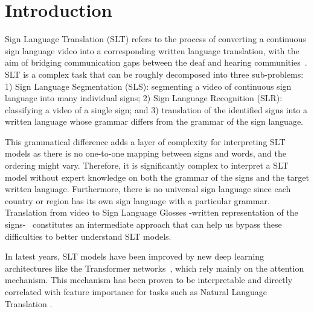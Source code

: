 \section{Introduction}

Sign Language Translation (SLT) refers to the process of converting a continuous sign language video into a corresponding written language translation, with the aim of bridging communication gaps between the deaf and hearing communities~\cite{de2023machine}. SLT is a complex task that can be roughly decomposed into three sub-problems: 1) Sign Language Segmentation (SLS): segmenting a video of continuous sign language into many individual signs; 2) Sign Language Recognition (SLR): classifying a video of a single sign; and 3) translation of the identified signs into a written language whose grammar differs from the grammar of the sign language.

This grammatical difference adds a layer of complexity for interpreting SLT models as there is no one-to-one mapping between signs and words, and the ordering might vary. Therefore, it is significantly complex to interpret a SLT model without expert knowledge on both the grammar of the signs and the target written language. Furthermore, there is no universal sign language since each country or region has its own sign language with a particular grammar. Translation from video to Sign Language Glosses -written representation of the signs-~\cite{camgoz2020sign} constitutes an intermediate approach that can help us bypass these difficulties to better understand SLT models.

In latest years, SLT models have been improved by new deep learning architectures like the Transformer networks~\cite{camgoz2020sign,yin2020better,de2021frozen,aloysius2021incorporating}, which rely mainly on the attention mechanism. This mechanism has been proven to be interpretable and directly correlated with feature importance for tasks such as Natural Language Translation \cite{vashishth2019attention}.


